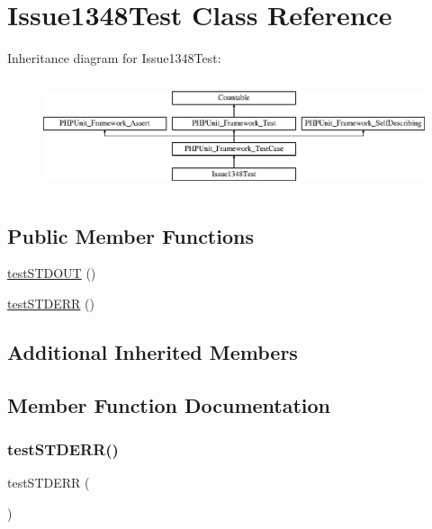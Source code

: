 \hypertarget{class_issue1348_test}{}\section{Issue1348\+Test Class Reference}
\label{class_issue1348_test}
Inheritance diagram for Issue1348\+Test\+:\begin{figure}[H]
\begin{center}
\leavevmode
\includegraphics[height=3.303835cm]{class_issue1348_test}
\end{center}
\end{figure}
\subsection*{Public Member Functions}
\begin{DoxyCompactItemize}
\item 
\mbox{\hyperlink{class_issue1348_test_a7444983935e38eaf04e6df1391e20977}{test\+S\+T\+D\+O\+UT}} ()
\item 
\mbox{\hyperlink{class_issue1348_test_aa189f3adc20325340214af74bb6999db}{test\+S\+T\+D\+E\+RR}} ()
\end{DoxyCompactItemize}
\subsection*{Additional Inherited Members}


\subsection{Member Function Documentation}
\mbox{\label{class_issue1348_test_aa189f3adc20325340214af74bb6999db}} 
\subsubsection{\texorpdfstring{test\+S\+T\+D\+E\+R\+R()}{testSTDERR()}}
{\footnotesize\ttfamily test\+S\+T\+D\+E\+RR (\begin{DoxyParamCaption}{ }\end{DoxyParamCaption})}

